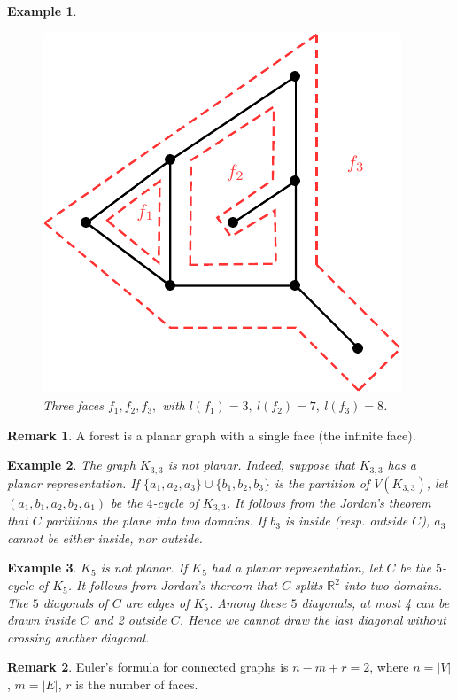 \documentclass[12pt,a4paper]{article}
\newtheorem{exmp}{Example}[section]
\theoremstyle{definition}
\newtheorem{rem}{Remark}[section]
\begin{document}
\begin{exmp} \
\begin{figure}[hbtp]
\centering
\includegraphics[scale=.9]{images/graph49.pdf}
\caption{Three faces $f_1,f_2,f_3,$ with $l(f_1)=3, \ l(f_2)=7, \ l(f_3)=8$.}
\end{figure}
\end{exmp}
\begin{rem}A forest is a planar graph with a single face (the infinite face). 
\end{rem}
\begin{exmp} The graph $K_{3,3}$ is not planar. Indeed, suppose that $K_{3,3}$ has a planar representation. If $\{a_1,a_2,a_3\} \cup \{b_1,b_2,b_3\}$ is the partition of $V(K_{3,3})$, let $(a_1, b_1,a_2,b_2,a_1)$ be the $4$-cycle of $K_{3,3}$. It follows from the Jordan's theorem that $C$ partitions the plane into two domains. If $b_3$ is inside (resp. outside $C$), $a_3$ cannot be either inside, nor outside. 
\end{exmp}
\begin{exmp}$K_5$ is not planar. If $K_5$ had a planar representation, let $C$ be the $5$-cycle of $K_5$. It follows from Jordan's thereom that $C$ splits $\mathbb{R}^2$ into two domains. The $5$ diagonals of $C$ are edges of $K_5$. Among these $5$ diagonals,  at most 4 can be drawn inside $C$ and 2 outside $C$. Hence we cannot draw the last diagonal without crossing another diagonal. 
\end{exmp}
\begin{rem}
Euler's formula for connected graphs is $n-m+r=2$, where $n=|V|$, $m=|E|$, $r$ is the number of faces.
\end{rem}
\end{document}
